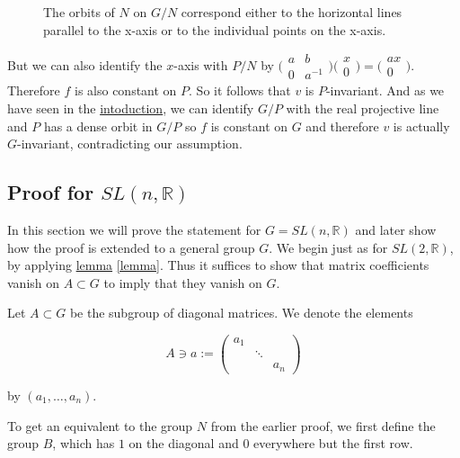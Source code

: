 \documentclass[
  12pt
]{article}
\theoremstyle{plain}
\newcommand{\G}{\ensuremath{G}\xspace}
\newcommand{\sltr}{\ensuremath{SL(2, \mathbb{R})}\xspace}
\newcommand{\slnr}{\ensuremath{SL(n, \mathbb{R})}\xspace}
\newcommand{\ipmatrix}[1]{%
\ensuremath{\big(\begin{smallmatrix} #1 \end{smallmatrix}\big)}\xspace}
\begin{document}
  \begin{figure}
    \begin{center}
    \end{center}
    \caption{The orbits of $N$ on $G/N$ correspond either to the horizontal lines parallel to the x-axis or to the individual points on the x-axis. }
    \label{fig:n-orbits-in-r2}
  \end{figure}

  But we can also identify the $x$-axis with $P/N$ by $\ipmatrix{a & b \\ 0 &
  a^{-1}}\ipmatrix{x \\ 0} = \ipmatrix{ax \\ 0}$. Therefore $f$ is also
  constant on $P$. So it follows that $v$ is $P$-invariant. And as we have seen
  in the \hyperref[sec:introduction]{intoduction}, we can identify $G/P$ with
  the real projective line and $P$ has a dense orbit in $G/P$ so $f$ is
  constant on $G$ and therefore $v$ is actually \G-invariant, contradicting our
  assumption.



\hypertarget{proof-for-slnr}{%
  \subsection{Proof for \texorpdfstring{$SL(n, \mathbb{R})$}{SL(n, R)}}
\label{proof-for-slnr}}




  In this section we will prove the statement for $G = \slnr$ and later show how
  the proof is extended to a general group \G. We begin just as for \sltr, by
  applying \hyperref[lemma]{lemma} \ref{lemma}. Thus it suffices to show that
  matrix coefficients vanish on $A \subset G$ to imply that they vanish on \G.

  Let $A \subset G$ be the subgroup of diagonal matrices. We denote the elements

  $$
  A \ni a := \begin{pmatrix}
    a_1 & & \\
        & \ddots & \\
        & & a_n
  \end{pmatrix}
  $$

  by $(a_1, \dots, a_n)$.

  To get an equivalent to the group $N$ from the earlier proof, we first define the group $B$, which has $1$ on the diagonal and $0$ everywhere but the first row.
\end{document}
